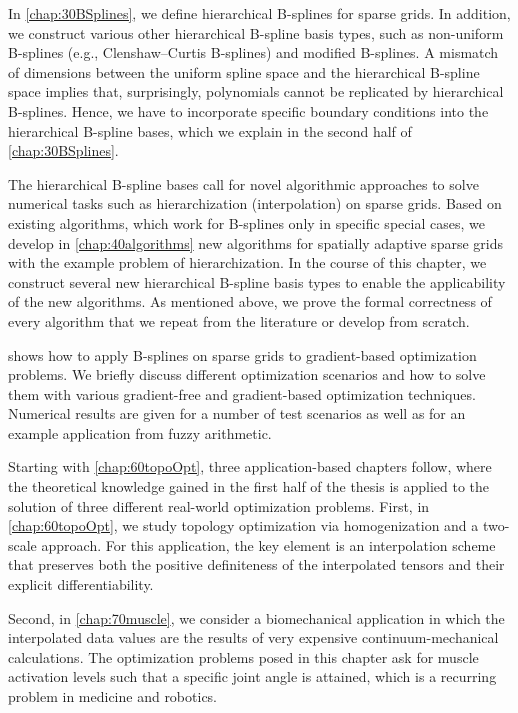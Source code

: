 In \cref{chap:30BSplines}, we define hierarchical B-splines for sparse grids.
In addition, we construct various other hierarchical
B-spline basis types, such as
non-uniform B-splines (e.g., Clenshaw--Curtis B-splines) and
modified B-splines.
A mismatch of dimensions between the uniform spline space and the
hierarchical B-spline space implies that, surprisingly,
polynomials cannot be replicated by hierarchical B-splines.
Hence, we have to incorporate specific boundary conditions
 into the hierarchical B-spline bases,
which we explain in the second half of \cref{chap:30BSplines}.

The hierarchical B-spline bases call for novel algorithmic approaches
to solve numerical tasks such as
hierarchization (interpolation) on sparse grids.
Based on existing algorithms,
which work for B-splines only in specific special cases,
we develop in \cref{chap:40algorithms} new algorithms for
spatially adaptive sparse grids with the example problem of hierarchization.
In the course of this chapter, we construct several new
hierarchical B-spline basis types to enable the
applicability of the new algorithms.
As mentioned above, we prove the formal correctness of every algorithm
that we repeat from the literature or develop from scratch.

 shows how to apply B-splines on sparse grids
to gradient-based optimization problems.
We briefly discuss different optimization scenarios and how to solve them
with various gradient-free and gradient-based optimization techniques.
Numerical results are given for a number of test scenarios as well
as for an example application from fuzzy arithmetic.

Starting with \cref{chap:60topoOpt}, three application-based chapters follow,
where the theoretical knowledge gained in the first half of the thesis
is applied to the solution of three different real-world optimization problems.
%
First, in \cref{chap:60topoOpt},
we study topology optimization via homogenization
and a two-scale approach.
For this application, the key element is an interpolation scheme
that preserves both the positive definiteness of the interpolated tensors and
their explicit differentiability.

Second, in \cref{chap:70muscle},
we consider a biomechanical application in which the interpolated data values
are the results of very expensive continuum-mechanical calculations.
The optimization problems posed in this chapter ask for
muscle activation levels such that a specific joint angle is attained,
which is a recurring problem in medicine and robotics.

